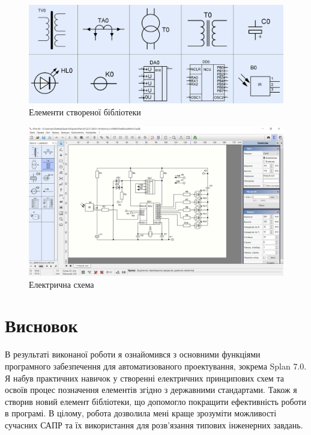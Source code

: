 \documentclass[a4paper]{article}
\begin{document}
    \begin{figure}[h]
        \centering
        \includegraphics[width=1\textwidth]{imgs/LW1.1.png}
        \caption{Елементи створеної бібліотеки}
        \label{fig:image_label1}
    \end{figure} 

    \newpage 

    \begin{figure}[h]
        \centering
        \includegraphics[width=1\textwidth]{imgs/LW1.3.png}
        \caption{Електрична схема}
        \label{fig:image_label2}
    \end{figure} 

    \section*{Висновок}
    В результаті виконаної роботи я ознайомився з основними функціями програмного забезпечення 
    для автоматизованого проектування, зокрема Splan 7.0. Я набув практичних навичок у створенні 
    електричних принципових схем та освоїв процес позначення елементів згідно з державними стандартами. 
    Також я створив новий елемент бібліотеки, що допомогло покращити ефективність роботи в програмі. 
    В цілому, робота дозволила мені краще зрозуміти можливості сучасних САПР та їх використання для 
    розв'язання типових інженерних завдань.
\end{document}
